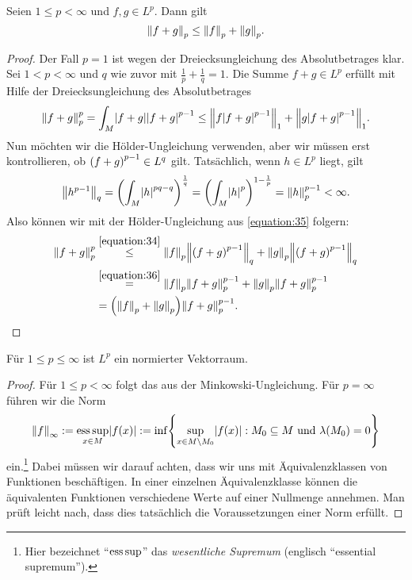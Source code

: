\begin{lemma}
	Seien \(1 \le p < \infty\) und \(f, g \in L^p\).
	Dann gilt
	\[
		\norm*{f + g}_p \le \norm*{f}_p + \norm*{g}_p.
	\]
\end{lemma}

\begin{proof}
	Der Fall \(p = 1\) ist wegen der Dreiecksungleichung des Absolutbetrages klar.
	Sei \(1 < p < \infty\) und \(q\) wie zuvor mit \(\frac{1}{p} + \frac{1}{q} = 1\).
	Die Summe \(f + g \in L^p\) erfüllt mit Hilfe der Dreiecksungleichung des Absolutbetrages
	\begin{equation}\label{equation:35}
		\norm*{f + g}_p^p = \int_M \absolute*{f + g}\absolute*{f + g}^{p - 1} \le \norm*{f\absolute*{f + g}^{p - 1}}_1 + \norm*{g\absolute*{f + g}^{p - 1}}_1.
	\end{equation}
	Nun möchten wir die Hölder-Ungleichung verwenden, aber wir müssen erst kontrollieren, ob \(\parentheses*{f + g}^{p - 1} \in L^q\) gilt.
	Tatsächlich, wenn \(h \in L^p\) liegt, gilt
	\begin{equation}\label{equation:36}
		\norm*{h^{p - 1}}_q = \parentheses*{\int_M \absolute*{h}^{pq - q}}^{\frac{1}{q}} = \parentheses*{\int_M \absolute*{h}^p}^{1 - \frac{1}{p}} = \norm*{h}_p^{p - 1} < \infty.
	\end{equation}
	Also können wir mit der Hölder-Ungleichung aus \eqref{equation:35} folgern:
	\begin{align*}
		\norm*{f + g}_p^p &\stackrel{\eqref{equation:34}}{\le} \norm*{f}_p \norm*{\parentheses*{f + g}^{p - 1}}_q + \norm*{g}_p \norm*{\parentheses*{f + g}^{p - 1}}_q\\
		&\stackrel{\eqref{equation:36}}{=} \norm*{f}_p \norm*{f + g}_p^{p - 1} + \norm*{g}_p \norm*{f + g}_p^{p - 1}\\
		&= \parentheses*{\norm*{f}_p + \norm*{g}_p}\norm*{f + g}_p^{p - 1}.
	\end{align*}
\end{proof}

\begin{lemma}
	Für \(1 \le p \le \infty\) ist \(L^p\) ein normierter Vektorraum.
\end{lemma}

\begin{proof}
	Für \(1 \le p < \infty\) folgt das aus der Minkowski-Ungleichung.
	Für \(p = \infty\) führen wir die Norm
	\begin{equation}
		\norm*{f}_\infty := \esssup_{x \in M}\absolute*{f\parentheses*{x}} := \inf\braces*{\sup_{x \in M \setminus M_0}\absolute*{f\parentheses*{x}} : M_0 \subseteq M\text{ und }\lambda\parentheses*{M_0} = 0}
	\end{equation}
	ein.\footnote{Hier bezeichnet ``\(\esssup\)'' das \emph{wesentliche Supremum} (englisch ``essential supremum'').}
	Dabei müssen wir darauf achten, dass wir uns mit Äquivalenzklassen von Funktionen beschäftigen.
	In einer einzelnen Äquivalenzklasse können die äquivalenten Funktionen verschiedene Werte auf einer Nullmenge annehmen.
	Man prüft leicht nach, dass dies tatsächlich die Voraussetzungen einer Norm erfüllt.
\end{proof}

